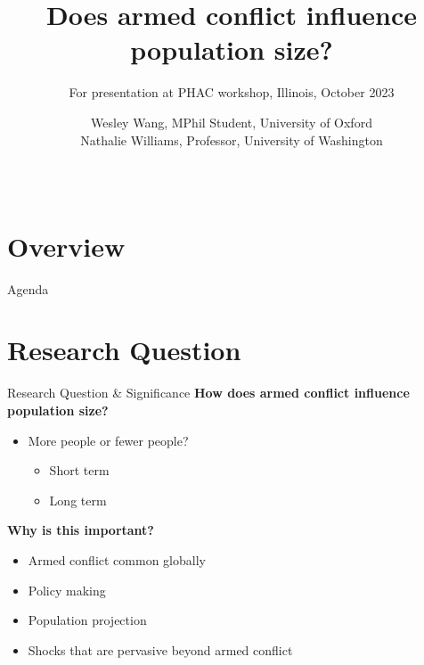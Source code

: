 \documentclass{beamer}
\title{Does armed conflict influence population size?}
\subtitle{For presentation at PHAC workshop, Illinois, October 2023}
\author{Wesley Wang, MPhil Student, University of Oxford \\
Nathalie Williams, Professor, University of Washington}
\date{\ }
\begin{document}
	\begin{frame}
		\titlepage	
	\end{frame}
	
	\section{Overview}

		\begin{frame}{Agenda}
			\tableofcontents 
		\end{frame}

	\section{Research Question}
		\begin{frame}{Research Question \& Significance}
			\textbf{How does armed conflict influence population size?}
				\begin{itemize}
					\item More people or fewer people?
					\begin{itemize}
						\item Short term
						\item Long term
					\end{itemize}
				\end{itemize}

			\textbf{Why is this important?}
				\begin{itemize}
					\item Armed conflict common globally
					\item Policy making
					\item Population projection
					\item Shocks that are pervasive beyond armed conflict
				\end{itemize}
		\end{frame}
\end{document}
